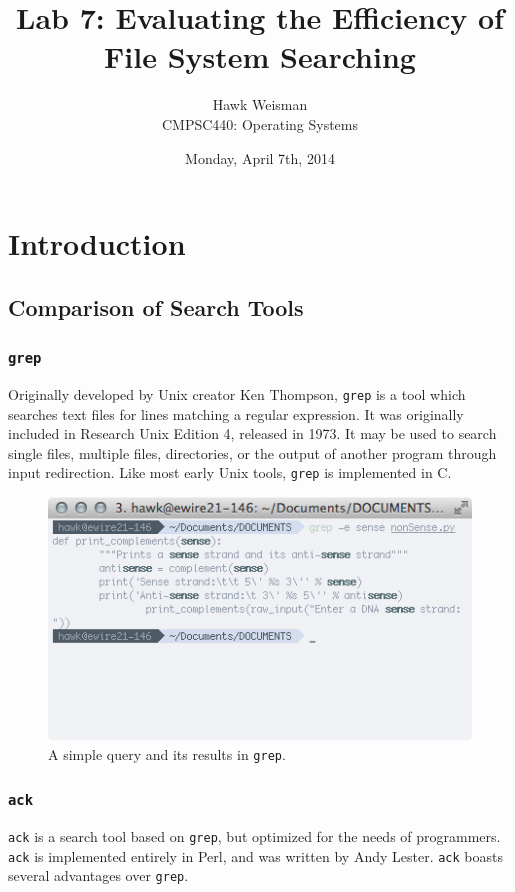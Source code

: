 \documentclass[12pt,letterpaper]{article}
\author{Hawk Weisman\\CMPSC440: Operating Systems}
\title{Lab 7: Evaluating the Efficiency of File System Searching}
\date{Monday, April 7th, 2014}
\begin{document}
	\maketitle
	\tableofcontents
	\section {Introduction}

		\subsection{Comparison of Search Tools}
			\subsubsection{\texttt{grep}}

				Originally developed by Unix creator Ken Thompson, \texttt{grep} is a tool which searches text files for lines matching a regular expression. It was originally included in Research Unix Edition 4, released in 1973. It may be used to search single files, multiple files, directories, or the output of another program through input redirection. Like most early Unix tools, \texttt{grep} is implemented in C.

				\begin{figure}[H]
					\centering
					\includegraphics[resolution=72, scale = 0.75]{Figures/grep.png}
					\caption{A simple query and its results in \texttt{grep}.}
					\label{fig:grep}
				\end{figure}

			\subsubsection{\texttt{ack}}
				\texttt{ack} is a search tool based on \texttt{grep}, but optimized for the needs of programmers. \texttt{ack} is implemented entirely in Perl, and was written by Andy Lester. \texttt{ack} boasts several advantages over \texttt{grep}. 
\end{document}

